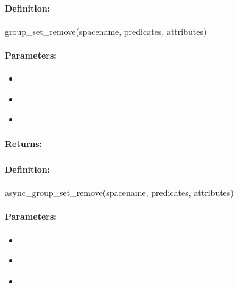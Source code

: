 \paragraph{Definition:}
\begin{rubycode}
group_set_remove(spacename, predicates, attributes)
\end{rubycode}

\paragraph{Parameters:}
\begin{itemize}[noitemsep]
\item {}\\

\item {}\\

\item {}\\

\end{itemize}

\paragraph{Returns:}


\pagebreak
\subsubsection{}
\label{api:ruby:async_group_set_remove}


\paragraph{Definition:}
\begin{rubycode}
async_group_set_remove(spacename, predicates, attributes)
\end{rubycode}

\paragraph{Parameters:}
\begin{itemize}[noitemsep]
\item {}\\

\item {}\\

\item {}\\

\end{itemize}


